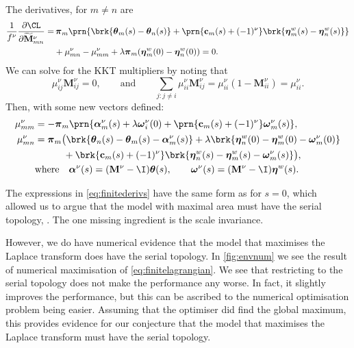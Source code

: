 \documentclass[12pt]{article}
\newcommand{\eq}{\pib}
\newcommand{\pib}{\boldsymbol{\pi}}
\newcommand{\etw}{\boldsymbol{\eta}^w}
\newcommand{\thb}{\boldsymbol{\theta}}
\newcommand{\omb}{\boldsymbol{\omega}}
\newcommand{\alb}{\boldsymbol{\alpha}}
\newcommand{\M}{\mathbf{M}}
\newcommand{\Mh}{\widetilde{\M}}
\renewcommand{\pdiff}[2]{\frac{\partial #1}{\partial #2}}
\begin{document}
The derivatives, for $m \neq n$ are
%
\begin{equation}\label{eq:finitederivs}
\begin{aligned}
  \frac{1}{f^\nu} \pdiff{\CL}{\Mh^\nu_{mn}} = & \,
    \eq_m \prn{ \brk{\thb_m(s) - \thb_n(s)}
     + \prn{\mathbf{c}_m(s) + (-1)^\nu} \brk{\etw_m(s) - \etw_n(s)} } \\
     &+ \mu^\nu_{mn} -  \mu^\nu_{mm}
     + \lambda \eq_m (\etw_{m}(0)-\etw_{n}(0)) 
    = 0.
\end{aligned}
\end{equation}
%
We can solve for the KKT multipliers by noting that
%
\begin{equation*}
  \mu^\nu_{ij} \M^\nu_{ij} = 0,
  \qquad \text{and} \qquad
  \sum_{j: j \neq i} \mu^\nu_{ii} \M^\nu_{ij} 
      = \mu^\nu_{ii} (1 - \M^\nu_{ii}) = \mu^\nu_{ii}.
\end{equation*}
%
Then, with some new vectors defined:
%
\begin{equation}\label{eq:kktsol}
\begin{aligned}
  \mu^\nu_{mm} &= - \eq_m \prn{ \alb^\nu_m(s) 
    + \lambda \omb^\nu_i(0) 
    + \prn{\mathbf{c}_m(s) + (-1)^\nu} \omb^\nu_m(s)
    }, \\
  \mu^\nu_{mn} &= \eq_m \big( 
      \brk{ \thb_n(s) - \thb_m(s) - \alb^\nu_m(s) }
    + \lambda \brk{ \etw_n(0) - \etw_m(0) - \omb^\nu_m(0) } 
  \\ &\phantom{= \eq_m \big( }
    + \brk{\mathbf{c}_m(s) + (-1)^\nu} 
        \brk{ \etw_n(s) - \etw_m(s) - \omb^\nu_m(s) }
     \big), \\
  &\text{where} \quad 
  \boldsymbol{\alpha}^\nu(s) = (\M^\nu - \I) \thb(s), \qquad
  \boldsymbol{\omega}^\nu(s) = (\M^\nu - \I) \etw(s).
\end{aligned}
\end{equation}
%

The expressions in \cref{eq:finitederivs} have the same form as for $s=0$, which allowed us to argue that the model with maximal area must have the serial topology, \cite{Lahiri2013synapse}.
The one missing ingredient is the scale invariance.

However, we do have numerical evidence that the model that maximises the Laplace transform does have the serial topology.
In \cref{fig:envnum} we see the result of numerical maximisation of \cref{eq:finitelagrangian}.
We see that restricting to the serial topology does not make the performance any worse.
In fact, it slightly improves the performance, but this can be ascribed to the numerical optimisation problem being easier.
Assuming that the optimiser did find the global maximum, this provides evidence for our conjecture that the model that maximises the Laplace transform must have the serial topology.
\end{document}
